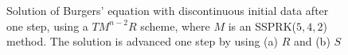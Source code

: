 \begin{figure}[t!]
    \centering
    \caption{Solution of Burgers' equation with discontinuous initial data 
    after one step, using a $TM^{n-2}R$ scheme, where $M$ is an 
    SSPRK($5,4,2$) method. The solution is advanced one step by using (a) $R$ and 
    (b) $S$}
    \label{fig:burgers_starting_method}
\end{figure}

